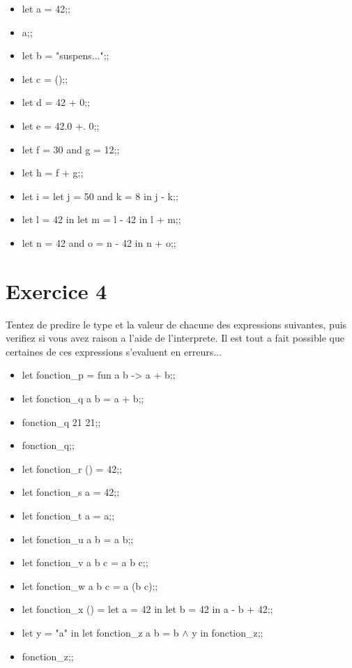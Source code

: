 \documentclass{life-fr}
\begin{document}
  \begin{itemize}
    \item let a = 42;;
    \item a;;
    \item let b = "suspens...";;
    \item let c = ();;
    \item let d = 42 + 0;;
    \item let e = 42.0 +. 0;;
    \item let f = 30 and g = 12;;
    \item let h = f + g;;
    \item let i = let j = 50 and k = 8 in j - k;;
    \item let l = 42 in let m = l - 42 in l + m;;
    \item let n = 42 and o = n - 42 in n + o;;
  \end{itemize}


  \section{Exercice 4}

    Tentez de predire le type et la valeur de chacune des expressions suivantes,
  puis verifiez si vous avez raison a l'aide de l'interprete. Il est tout a fait
  possible que certaines de ces expressions s'evaluent en erreurs...

  \begin{itemize}
    \item let fonction\_p = fun a b -> a + b;;
    \item let fonction\_q a b = a + b;;
    \item fonction\_q 21 21;;
    \item fonction\_q;;
    \item let fonction\_r () = 42;;
    \item let fonction\_s a = 42;;
    \item let fonction\_t a = a;;
    \item let fonction\_u a b = a b;;
    \item let fonction\_v a b c = a b c;;
    \item let fonction\_w a b c = a (b c);;
    \item let fonction\_x () = let a = 42 in let b = 42 in a - b + 42;;
    \item let y = "a" in let fonction\_z a b = b $\wedge$ y in fonction\_z;;
    \item fonction\_z;;
  \end{itemize}
\end{document}
